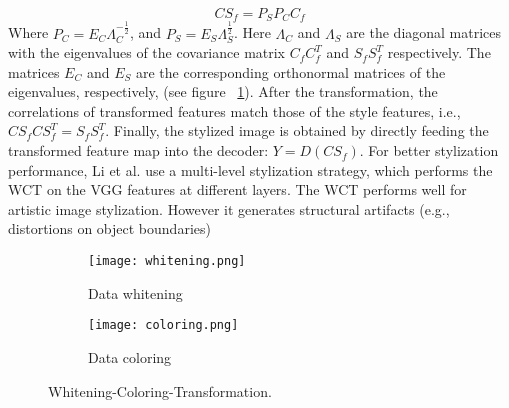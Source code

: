 \begin{equation}
CS_f = P_SP_CC_f
\end{equation}
Where $P_C=E_C\Lambda_C^{-\frac{1}{2}}$, and $P_S=E_S\Lambda_S^{\frac{1}{2}}$. Here $\Lambda_C$ and $\Lambda_S$ are the diagonal matrices with the eigenvalues of the covariance matrix $C_fC_f^T$ and $S_fS_f^T$ respectively. The matrices $E_C$ and $E_S$ are the corresponding orthonormal matrices of the eigenvalues, respectively, (see figure ~\ref{fig:WCT}). After the transformation, the correlations of
transformed features match those of the style features, i.e., $CS_fCS_f^T=S_fS_f^T$. Finally, the stylized image is obtained by directly feeding the transformed feature
map into the decoder: $Y = D(CS_f)$. For better stylization performance, Li et
al. \cite{bib11} use a multi-level stylization strategy, which performs the WCT on the
VGG features at different layers.
The WCT performs well for artistic image stylization. However it generates
structural artifacts (e.g., distortions on object boundaries)
\begin{figure}[h!]
	\centering
	\begin{subfigure}[b]{0.4\linewidth}
	\texttt{[image: whitening.png]}
		\caption{Data whitening}
		\end{subfigure}
	\begin{subfigure}[b]{0.4\linewidth}
	\texttt{[image: coloring.png]}
	\caption{Data coloring}
	\end{subfigure}
	\caption{Whitening-Coloring-Transformation.}
	\label{fig:WCT}
\end{figure}